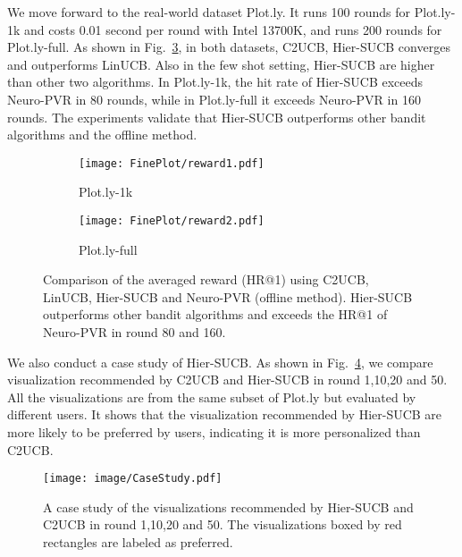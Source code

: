 We move forward to the real-world dataset Plot.ly. It runs 100 rounds for Plot.ly-1k and costs 0.01 second per round with Intel 13700K, and runs 200 rounds for Plot.ly-full. 
As shown in Fig.~\ref{fig:RealWorld}, in both datasets, C2UCB, Hier-SUCB converges and outperforms LinUCB. Also in the few shot setting, Hier-SUCB are higher than other two algorithms. In Plot.ly-1k, the hit rate of Hier-SUCB exceeds Neuro-PVR in 80 rounds, while in Plot.ly-full it exceeds Neuro-PVR in 160 rounds. The experiments validate that Hier-SUCB outperforms other bandit algorithms and the offline method.
\begin{figure}
	\centering
	\begin{subfigure}{0.48\columnwidth}
		\centering
		\texttt{[image: FinePlot/reward1.pdf]}
		\caption{Plot.ly-1k}
		\label{fig:reward1}
	\end{subfigure}
	\begin{subfigure}{0.48\columnwidth}
    	\centering
    	\texttt{[image: FinePlot/reward2.pdf]}
    	\caption{Plot.ly-full}
    	\label{fig:reward2}
	\end{subfigure}
 \vspace{-1em}
	\caption{Comparison of the averaged reward (HR@1) using C2UCB, LinUCB, Hier-SUCB and Neuro-PVR (offline method). Hier-SUCB outperforms other bandit algorithms and exceeds the HR@1 of Neuro-PVR in round 80 and 160.}
	\label{fig:RealWorld}
 \vspace{-1em}
\end{figure}

We also conduct a case study of Hier-SUCB. As shown in Fig.~\ref{fig:caseStudy}, we compare visualization recommended by C2UCB and Hier-SUCB in round 1,10,20 and 50. All the visualizations are from the same subset of Plot.ly but evaluated by different users. It shows that the visualization recommended by Hier-SUCB are more likely to be preferred by users, indicating it is more personalized than C2UCB.

\begin{figure}
    \centering
    \texttt{[image: image/CaseStudy.pdf]}
    \vspace{-1em}
    \caption{A case study of the visualizations recommended by Hier-SUCB and C2UCB in round 1,10,20 and 50. The visualizations boxed by red rectangles are labeled as preferred.}
    \label{fig:caseStudy}
    \vspace{-2em}
\end{figure}

